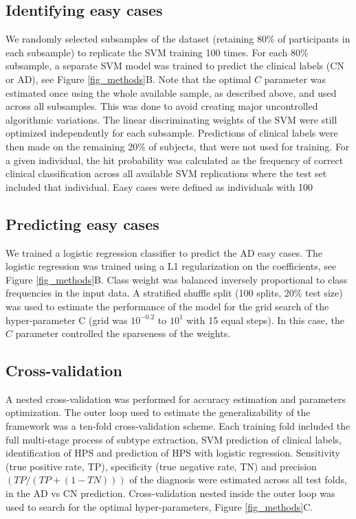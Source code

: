\documentclass[authoryear]{elsarticle}
\begin{document}
\subsection*{Identifying easy cases}
We randomly selected subsamples of the dataset (retaining 80\% of participants in each subsample) to replicate the SVM training 100 times. For each 80\% subsample, a separate SVM model was trained to predict the clinical labels (CN or AD), see Figure \ref{fig_methods}B. Note that the optimal $C$ parameter was estimated once using the whole available sample, as described above, and used across all subsamples. This was done to avoid creating major uncontrolled algorithmic variations. The linear discriminating weights of the SVM were still optimized independently for each subsample. Predictions of clinical labels were then made on the remaining 20\% of subjects, that were not used for training. For a given individual, the hit probability was calculated as the frequency of correct clinical classification across all available SVM replications where the test set included that individual. Easy cases were defined as individuals with 100%
\subsection*{Predicting easy cases}
We trained a logistic regression classifier \cite{Fan2008} to predict the AD easy cases. The logistic regression was trained using a L1 regularization on the coefficients, see Figure \ref{fig_methods}B. Class weight was balanced inversely proportional to class frequencies in the input data. A stratified shuffle split (100 splits, 20\% test size) was used to estimate the performance of the model for the grid search of the hyper-parameter C (grid was $10^{-0.2}$ to $10^{1}$ with 15 equal steps). In this case, the $C$ parameter controlled the sparseness of the weights.

\subsection*{Cross-validation}

A nested cross-validation was performed for accuracy estimation and parameters optimization. The outer loop used to estimate the generalizability of the framework was a ten-fold cross-validation scheme. Each training fold included the full multi-stage process of subtype extraction, SVM prediction of clinical labels, identification of HPS and prediction of HPS with logistic regression. Sensitivity (true positive rate, TP), specificity (true negative rate, TN) and precision $(TP/(TP+(1-TN)))$ of the diagnosis were estimated across all test folds, in the AD vs CN prediction. Cross-validation nested inside the outer loop was used to search for the optimal hyper-parameters, Figure \ref{fig_methods}C. 
\end{document}
